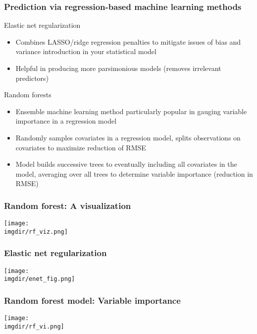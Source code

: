 \documentclass[aspectratio=169, t, 10pt]{beamer}
\begin{document}
\begin{frame}
  \frametitle{Prediction via regression-based machine learning methods}
  \begin{block}{Elastic net regularization}
    \begin{itemize}
    \item Combines LASSO/ridge regression penalties to mitigate issues
      of bias and variance introduction in your statistical model
    \item Helpful in producing more parsimonious models (removes
      irrelevant predictors)
    \end{itemize}
  \end{block}
  \begin{block}{Random forests}
    \begin{itemize}
      \item Ensemble machine learning method particularly popular in
        gauging variable importance in a regression model
      \item Randomly samples covariates in a regression model, splits
        observations on covariates to maximize reduction of RMSE 
      \item Model builds successive trees to eventually including all
        covariates in the model, averaging over all trees to determine
        variable importance (reduction in RMSE)
      \end{itemize}
   \end{block}
\end{frame}
      
      
\begin{frame}
  \frametitle{Random forest: A visualization}\citep{koehrsen_2018}
    \centering
        \texttt{[image: \\imgdir/rf\_viz.png]}
 \end{frame}

\begin{frame}
  \frametitle{Elastic net regularization}
    \centering
        \texttt{[image: \\imgdir/enet\_fig.png]}
 \end{frame}

\begin{frame}
  \frametitle{Random forest model: Variable importance}
    \centering
        \texttt{[image: \\imgdir/rf\_vi.png]}
 \end{frame}
\end{document}
